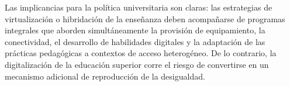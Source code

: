 \documentclass{article}
\begin{document}
Las implicancias para la política universitaria son claras: las estrategias de virtualización o hibridación de la enseñanza deben acompañarse de programas integrales que aborden simultáneamente la provisión de equipamiento, la conectividad, el desarrollo de habilidades digitales y la adaptación de las prácticas pedagógicas a contextos de acceso heterogéneo. De lo contrario, la digitalización de la educación superior corre el riesgo de convertirse en un mecanismo adicional de reproducción de la desigualdad.



\printbibliography
\end{document}
